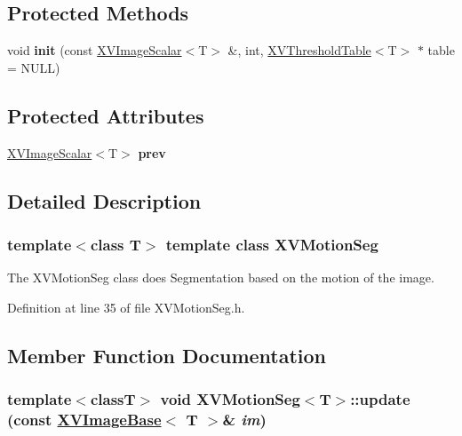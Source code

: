 \subsection*{Protected Methods}
\begin{CompactItemize}
\item 
\label{XVMotionSeg_b0}
\hypertarget{class_XVMotionSeg_b0}{
void {\bf init} (const \hyperlink{class_XVImageScalar}{XVImage\-Scalar}$<$T$>$ \&, int, \hyperlink{class_XVThresholdTable}{XVThreshold\-Table}$<$T$>$ $\ast$ table = NULL)}

\end{CompactItemize}
\subsection*{Protected Attributes}
\begin{CompactItemize}
\item 
\hyperlink{class_XVImageScalar}{XVImage\-Scalar}$<$T$>$ {\bf prev}
\end{CompactItemize}


\subsection{Detailed Description}
\subsubsection*{template$<$class T$>$  template class XVMotion\-Seg}

The XVMotion\-Seg class does Segmentation based on the motion of the image.





Definition at line 35 of file XVMotion\-Seg.h.

\subsection{Member Function Documentation}
\label{XVMotionSeg_a3}
\hypertarget{class_XVMotionSeg_a3}{
\subsubsection[update]{\setlength{\rightskip}{0pt plus 5cm}template$<$classT$>$ void XVMotion\-Seg$<$T$>$::update (const \hyperlink{class_XVImageBase}{XVImage\-Base}$<$ T $>$\& {\em im})}}




